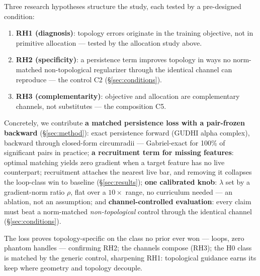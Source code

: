 Three research hypotheses structure the study, each tested by a
pre-designed condition:
\begin{enumerate}
\setlength{\itemsep}{1pt}
\item \textbf{RH1 (diagnosis)}: topology errors originate in the
  training objective, not in primitive allocation --- tested by the
  allocation study above.
\item \textbf{RH2 (specificity)}: a persistence term improves topology
  in ways no norm-matched non-topological regularizer through the
  identical channel can reproduce --- the control C2
  (\S\ref{sec:conditions}).
\item \textbf{RH3 (complementarity)}: objective and allocation are
  complementary channels, not substitutes --- the composition C5.
\end{enumerate}
Concretely, we contribute \textbf{a matched persistence loss with a
pair-frozen backward} (\S\ref{sec:method}): exact persistence forward
(GUDHI alpha complex), backward through closed-form circumradii ---
Gabriel-exact for 100\% of significant pairs in practice;
\textbf{a recruitment term for missing features}: optimal matching
yields zero gradient when a target feature has no live counterpart;
recruitment attaches the nearest live bar, and removing it collapses
the loop-class win to baseline (\S\ref{sec:results}); \textbf{one calibrated knob}: $\lambda$ set by a
gradient-norm ratio $\rho$, flat over a $10\times$ range, no curriculum
needed --- an ablation, not an assumption;
and \textbf{channel-controlled evaluation}: every claim must beat a
norm-matched \emph{non-topological} control through the identical
channel (\S\ref{sec:conditions}).

The loss proves topology-specific on the class no prior ever won ---
loops, zero phantom handles --- confirming RH2; the channels compose
(RH3); the H0 class is matched by the generic control, sharpening RH1:
topological guidance earns its keep where geometry and topology
decouple.
